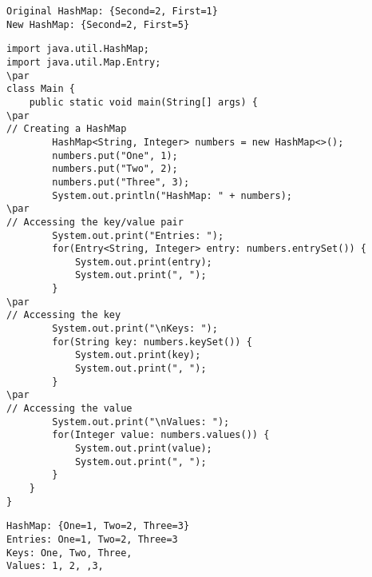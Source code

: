 \documentclass{book}
\def\lthtmlcheckvsize{\ifdim\ht\sizebox<\vsize 
  \ifdim\wd\sizebox<\hsize\expandafter\hfill\fi \expandafter\vfill
  \else\expandafter\vss\fi}%
\begin{document}
{\newpage\clearpage
{}%
\begin{lstlisting}
Original HashMap: {Second=2, First=1}
New HashMap: {Second=2, First=5}
\end{lstlisting}%
\lthtmlfigureZ
\lthtmlcheckvsize\clearpage}

{\newpage\clearpage
{}%
\begin{lstlisting}
import java.util.HashMap;
import java.util.Map.Entry;
\par
class Main {
    public static void main(String[] args) {
\par
// Creating a HashMap
        HashMap<String, Integer> numbers = new HashMap<>();
        numbers.put("One", 1);
        numbers.put("Two", 2);
        numbers.put("Three", 3);
        System.out.println("HashMap: " + numbers);
\par
// Accessing the key/value pair
        System.out.print("Entries: ");
        for(Entry<String, Integer> entry: numbers.entrySet()) {
            System.out.print(entry);
            System.out.print(", ");
        }
\par
// Accessing the key
        System.out.print("\nKeys: ");
        for(String key: numbers.keySet()) {
            System.out.print(key);
            System.out.print(", ");
        }
\par
// Accessing the value
        System.out.print("\nValues: ");
        for(Integer value: numbers.values()) {
            System.out.print(value);
            System.out.print(", ");
        }
    }
}
\end{lstlisting}%
\lthtmlfigureZ
\lthtmlcheckvsize\clearpage}

{\newpage\clearpage
{}%
\begin{lstlisting}
HashMap: {One=1, Two=2, Three=3}
Entries: One=1, Two=2, Three=3
Keys: One, Two, Three,
Values: 1, 2, ,3,
\end{lstlisting}%
\lthtmlfigureZ
\lthtmlcheckvsize\clearpage}
\end{document}

